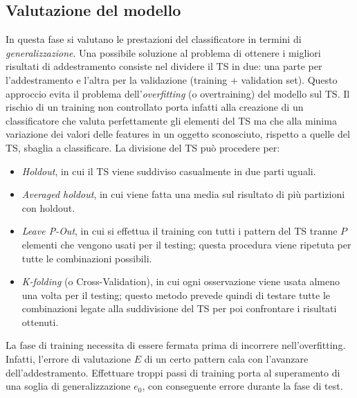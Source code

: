 \documentclass[a4paper,oneside,titlepage]{book}
\begin{document}
\subsection{Valutazione del modello}
In questa fase si valutano le prestazioni del classificatore in termini di \textit{generalizzazione}. Una possibile soluzione al problema di ottenere i migliori risultati di addestramento consiste nel dividere il TS in due: una parte per l'addestramento e l'altra per la validazione (training + validation set). Questo approccio evita il problema dell'\textit{overfitting} (o overtraining) del modello sul TS. Il rischio di un training non controllato porta infatti alla creazione di un classificatore che valuta perfettamente gli elementi del TS ma che alla minima variazione dei valori delle features in un oggetto sconosciuto, rispetto a quelle del TS, sbaglia a classificare. La divisione del TS può procedere per:
\begin{itemize}
    \item \textit{Holdout}, in cui il TS viene suddiviso casualmente in due parti uguali.
    \item \textit{Averaged holdout}, in cui viene fatta una media sul risultato di più partizioni con holdout.
    \item \textit{Leave P-Out}, in cui si effettua il training con tutti i pattern del TS tranne $P$ elementi che vengono usati per il testing; questa procedura viene ripetuta per tutte le combinazioni possibili.
    \item \textit{K-folding} (o Cross-Validation), in cui ogni osservazione viene usata almeno una volta per il testing; questo metodo prevede quindi di testare tutte le combinazioni legate alla suddivisione del TS per poi confrontare i risultati ottenuti.
\end{itemize}
La fase di training necessita di essere fermata prima di incorrere nell'overfitting. Infatti, l'errore di valutazione $E$ di un certo pattern cala con l'avanzare dell'addestramento. Effettuare troppi passi di training porta al superamento di una soglia di generalizzazione $e_0$, con conseguente errore durante la fase di test.
\end{document}

